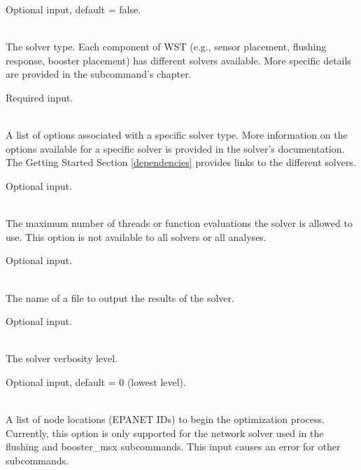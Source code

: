 \begin{description}[topsep=0pt,parsep=0.5em,itemsep=-0.4em]
\begin{description}[topsep=0pt,parsep=0.5em,itemsep=-0.4em]
                Optional input, default = false.
  \end{description}
  \item[{solver}]\hfill
  \begin{description}[topsep=0pt,parsep=0.5em,itemsep=-0.4em]
    \item[{type}]\hfill
\\The solver type. Each component of WST
				(e.g., sensor placement, flushing response, booster 
				placement) has different 
				solvers available. More specific details are provided in 
				the subcommand's chapter.
                
                Required input.
    \item[{options}]\hfill
\\A list of options associated with a specific solver type. More
            information on the options available for a specific solver
            is provided in the solver's documentation. The Getting
            Started Section \ref{dependencies} provides links to the
            different solvers.
            
            Optional input.
    \item[{threads}]\hfill
\\The maximum number of threads or function evaluations the solver is
                allowed to use.  This option is not available to all solvers or all analyses.
                
                Optional input.
    \item[{logfile}]\hfill
\\The name of a file to output the results of the solver.
                
                Optional input.
    \item[{verbose}]\hfill
\\The solver verbosity level.
                
                Optional input, default = 0 (lowest level).
    \item[{initial points}]\hfill
    \begin{description}[topsep=0pt,parsep=0.5em,itemsep=-0.4em]
      \item[{nodes}]\hfill
\\A list of node locations (EPANET IDs) to begin the optimization
        process. Currently, this option is only supported for the
        network solver used in the flushing and booster\_msx
        subcommands. This input causes an error for other subcommands.
        

\end{description}
\end{description}
\end{description}
